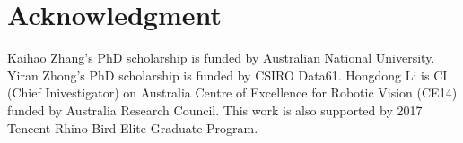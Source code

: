 \documentclass[journal]{IEEEtran}
\begin{document}
\section*{Acknowledgment}
Kaihao Zhang's PhD scholarship is funded by Australian National University. Yiran Zhong's PhD scholarship is funded by CSIRO Data61. Hongdong Li is CI (Chief Inivestigator) on Australia Centre of Excellence for Robotic Vision (CE14) funded by Australia Research Council. This work is also supported by 2017 Tencent Rhino Bird Elite Graduate Program.



\ifCLASSOPTIONcaptionsoff
  \newpage
\fi





%
%
%



{


}


%
\end{document}
